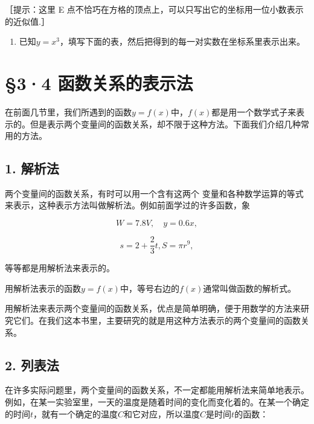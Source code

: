 ［提示：这里 E
点不恰巧在方格的顶点上，可以只写出它的坐标用一位小数表示的近似值.］

\begin{enumerate}[start=3]
\item
  已知\(y = x^3\)，填写下面的表，然后把得到的每一对实数在坐标系里表示出来。
\end{enumerate}

{\centering
\small\setlength{\tabcolsep}{3pt}%
\par
}

\section{§3·4 函数关系的表示法}

在前面几节里，我们所遇到的函数\(y = f(x)\)中，\(f(x)\)都是用一个数学式子来表示的。但是表示两个变量间的函数关系，却不限于这种方法。下面我们介绍几种常用的方法。

\subsection{1. 解析法}

两个变量间的函数关系，有时可以用一个含有这两个
变量和各种数学运算的等式来表示，这种表示方法叫做解析法。例如前面学过的许多函数，象

\[
W = 7.8 V, \quad y = 0.6 x,
\]

\[
s = 2 + \frac{2}{3} t, S = \pi r^{9},
\]

等等都是用解析法来表示的。

用解析法表示的函数\(y = f(x)\)中，等号右边的\(f(x)\)通常叫做函数的解析式。

用解析法来表示两个变量间的函数关系，优点是简单明确，便于用数学的方法来研究它们。在我们这本书里，主要研究的就是用这种方法表示的两个变量间的函数关系。

\subsection{2. 列表法}

在许多实际问题里，两个变量间的函数关系，不一定都能用解析法来简单地表示。例如，在某一实验室里，一天的温度是随着时间的变化而变化着的。在某一个确定的时间\(t\)，就有一个确定的温度\(C\)和它对应，所以温度\(C\)是时间\(t\)的函数：

